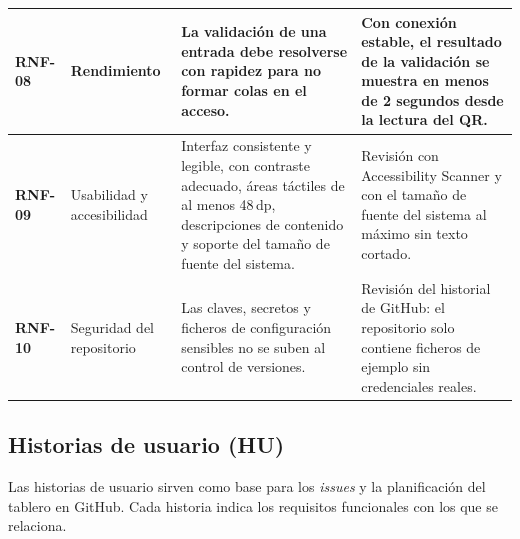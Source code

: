 \documentclass[11pt,a4paper]{article}
\begin{document}
\begin{longtable}{L{1.6cm} L{2.8cm} L{5.0cm} L{4.6cm}}
\midrule
\textbf{RNF-08} & Rendimiento & La validación de una entrada debe resolverse con rapidez para no formar colas en el acceso. & Con conexión estable, el resultado de la validación se muestra en menos de 2 segundos desde la lectura del QR. \\
\midrule
\textbf{RNF-09} & Usabilidad y accesibilidad & Interfaz consistente y legible, con contraste adecuado, áreas táctiles de al menos 48\,dp, descripciones de contenido y soporte del tamaño de fuente del sistema. & Revisión con Accessibility Scanner y con el tamaño de fuente del sistema al máximo sin texto cortado. \\
\midrule
\textbf{RNF-10} & Seguridad del repositorio & Las claves, secretos y ficheros de configuración sensibles no se suben al control de versiones. & Revisión del historial de GitHub: el repositorio solo contiene ficheros de ejemplo sin credenciales reales. \\
\end{longtable}

\subsection{Historias de usuario (HU)}
Las historias de usuario sirven como base para los \textit{issues} y la planificación del tablero en GitHub. Cada historia indica los requisitos funcionales con los que se relaciona.
\end{document}
